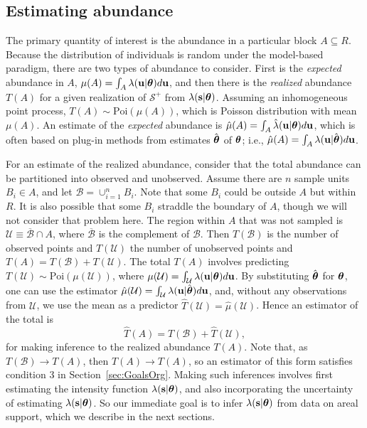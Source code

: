 \documentclass[12pt, titlepage]{article}\usepackage[]{graphicx}\usepackage[]{color}
\newcommand{\bs}{\ensuremath{\mathbf{s}}}
\newcommand{\bu}{\ensuremath{\mathbf{u}}}
\newcommand{\cS}{\ensuremath{\mathcal{S}}}
\def\bs{\mathbf{s}}
\def\bu{\mathbf{u}}
\def\cB{\mathcal{B}}
\def\cU{\mathcal{U}}
\def\btheta{\mbox{\boldmath $\theta$}}
\def\Poi{\textrm{Poi}}
\begin{document}
\subsection{Estimating abundance}

The primary quantity of interest is the abundance in a particular block $A \subseteq R$. Because the distribution of individuals is random under the model-based paradigm, there are two types of abundance to consider. First is the {\em expected} abundance in $A$, $\mu(A)=\int_A \lambda(\bu|\btheta)d\bu$, and then there is the {\em realized} abundance $T(A)$ for a given realization of $\cS^+$ from $\lambda(\bs|\btheta)$. Assuming an inhomogeneous point process, $T(A) \sim \Poi(\mu(A))$, which is Poisson distribution with mean $\mu(A)$. An estimate of the {\em expected} abundance is $\hat{\mu}(A) = \int_A \hat{\lambda}(\bu|\btheta) d\bu$, which is often based on plug-in methods from estimates $\hat{\btheta}$ of $\btheta$; i.e.,  $\hat{\mu}(A) = \int_A \lambda(\bu|\hat{\btheta}) d\bu$. 

For an estimate of the realized abundance, consider that the total abundance can be partitioned into observed and unobserved. Assume there are $n$ sample units $B_i \in A$, and let $\cB = \cup_{i = 1}^n B_i$.  Note that some $B_i$ could be outside $A$ but within $R$.  It is also possible that some $B_i$ straddle the boundary of $A$, though we will not consider that problem here. The region within $A$ that was not sampled is $\cU \equiv \overline{\cB} \cap A$, where $\overline{\cB}$ is the complement of $\cB$. Then $T(\cB)$ is the number of observed points and $T(\cU)$ the number of unobserved points and $T(A) = T(\cB) + T(\cU)$. The total $T(A)$ involves predicting $T(\cU) \sim \Poi(\mu(\cU))$, where $\mu(\cU)= \int_{\cU} \lambda(\bu|\btheta) d\bu$. By substituting $\hat{\btheta}$ for $\btheta$, one can use the estimator $\hat{\mu}(\cU)= \int_{\cU} \lambda(\bu|\hat{\btheta}) d\bu$, and, without any observations from $\cU$, we use the mean as a predictor $\widehat{T}(\cU) = \hat{\mu}(\cU)$. Hence an estimator of the total is
\begin{equation}\label{eq:AbunEst}
	\widehat{T}(A) = T(\cB) + \widehat{T}(\cU),
\end{equation}
for making inference to the realized abundance $T(A)$. Note that, as $T(\cB) \rightarrow T(A)$, then $\widehat{T}(A) \rightarrow T(A)$, so an estimator of this form satisfies condition 3 in Section~\ref{sec:GoalsOrg}. Making such inferences involves first estimating the intensity function $\lambda(\bs|\btheta)$, and also incorporating the uncertainty of estimating $\lambda(\bs|\btheta)$.  So our immediate goal is to infer $\lambda(\bs|\btheta)$ from data on areal support, which we describe in the next sections.
\end{document}
